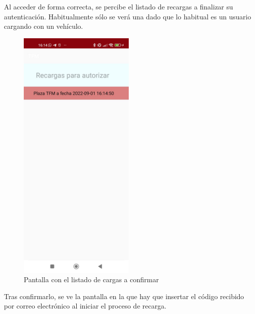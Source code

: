 \documentclass[12pt,a4paper,onecolumn,oneside]{report}
\begin{document}
Al acceder de forma correcta, se percibe el listado de recargas a finalizar su autenticación. Habitualmente sólo se verá una dado que lo habitual es un usuario cargando con un vehículo.

\begin{figure}[H] 
\centering
  \includegraphics[width=0.5\textwidth]{figuras/design7.png}
  \caption[Pantalla con el listado de cargas a confirmar]{Pantalla con el listado de cargas a confirmar\\
  }
  \label{fig:design7}
\end{figure}

Tras confirmarlo, se ve la pantalla en la que hay que insertar el código recibido por correo electrónico al iniciar el proceso de recarga.
\end{document}
